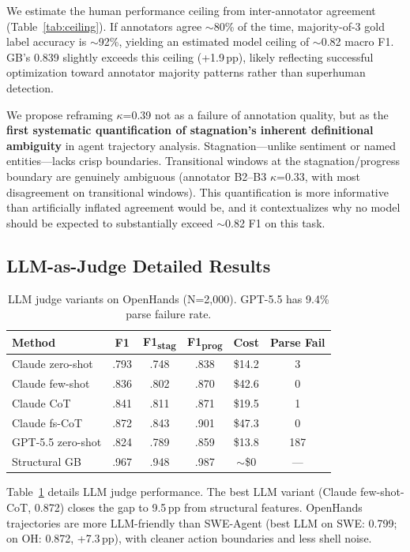 \documentclass[11pt,a4paper]{article}
\begin{document}
We estimate the human performance ceiling from inter-annotator agreement (Table~\ref{tab:ceiling}).
If annotators agree $\sim$80\% of the time, majority-of-3 gold label accuracy is $\sim$92\%, yielding an estimated model ceiling of $\sim$0.82 macro F1.
GB's 0.839 slightly exceeds this ceiling (+1.9\,pp), likely reflecting successful optimization toward annotator majority patterns rather than superhuman detection.

We propose reframing $\kappa$=0.39 not as a failure of annotation quality, but as the \textbf{first systematic quantification of stagnation's inherent definitional ambiguity} in agent trajectory analysis.
Stagnation---unlike sentiment or named entities---lacks crisp boundaries.
Transitional windows at the stagnation/progress boundary are genuinely ambiguous (annotator B2--B3 $\kappa$=0.33, with most disagreement on transitional windows).
This quantification is more informative than artificially inflated agreement would be, and it contextualizes why no model should be expected to substantially exceed $\sim$0.82 F1 on this task.

\subsection{LLM-as-Judge Detailed Results}

\begin{table}[t]
\centering
\small
\begin{tabular}{lccccc}
\toprule
\textbf{Method} & \textbf{F1} & \textbf{F1\textsubscript{stag}} & \textbf{F1\textsubscript{prog}} & \textbf{Cost} & \textbf{Parse Fail} \\
\midrule
Claude zero-shot & .793 & .748 & .838 & \$14.2 & 3 \\
Claude few-shot & .836 & .802 & .870 & \$42.6 & 0 \\
Claude CoT & .841 & .811 & .871 & \$19.5 & 1 \\
Claude fs-CoT & .872 & .843 & .901 & \$47.3 & 0 \\
GPT-5.5 zero-shot & .824 & .789 & .859 & \$13.8 & 187 \\
\midrule
Structural GB & .967 & .948 & .987 & $\sim$\$0 & --- \\
\bottomrule
\end{tabular}
\caption{LLM judge variants on OpenHands (N=2{,}000). GPT-5.5 has 9.4\% parse failure rate.}
\label{tab:llm-judge}
\end{table}

Table~\ref{tab:llm-judge} details LLM judge performance.
The best LLM variant (Claude few-shot-CoT, 0.872) closes the gap to 9.5\,pp from structural features.
OpenHands trajectories are more LLM-friendly than SWE-Agent (best LLM on SWE: 0.799; on OH: 0.872, +7.3\,pp), with cleaner action boundaries and less shell noise.
\end{document}
